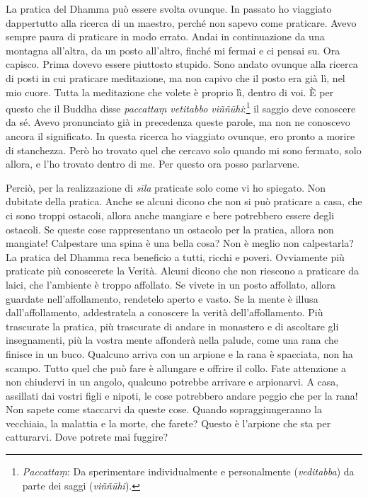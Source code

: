 La pratica del Dhamma può essere svolta ovunque. In passato ho viaggiato
dappertutto alla ricerca di un maestro, perché non sapevo come
praticare. Avevo sempre paura di praticare in modo errato. Andai in
continuazione da una montagna all'altra, da un posto all'altro, finché
mi fermai e ci pensai su. Ora capisco. Prima dovevo essere piuttosto
stupido. Sono andato ovunque alla ricerca di posti in cui praticare
meditazione, ma non capivo che il posto era già lì, nel mio cuore. Tutta
la meditazione che volete è proprio lì, dentro di voi. È per questo che
il Buddha disse \emph{paccattaṃ vetitabbo viññūhi}:\footnote{\emph{Paccattaṃ}:
  Da sperimentare individualmente e personalmente (\emph{veditabba}) da
  parte dei saggi (\emph{viññūhi}).} il saggio deve conoscere da sé.
Avevo pronunciato già in precedenza queste parole, ma non ne conoscevo
ancora il significato. In questa ricerca ho viaggiato ovunque, ero
pronto a morire di stanchezza. Però ho trovato quel che cercavo solo
quando mi sono fermato, solo allora, e l'ho trovato dentro di me. Per
questo ora posso parlarvene.

Perciò, per la realizzazione di \emph{sīla} praticate solo come vi ho
spiegato. Non dubitate della pratica. Anche se alcuni dicono che non si
può praticare a casa, che ci sono troppi ostacoli, allora anche mangiare
e bere potrebbero essere degli ostacoli. Se queste cose rappresentano un
ostacolo per la pratica, allora non mangiate! Calpestare una spina è una
bella cosa? Non è meglio non calpestarla? La pratica del Dhamma reca
beneficio a tutti, ricchi e poveri. Ovviamente più praticate più
conoscerete la Verità. Alcuni dicono che non riescono a praticare da
laici, che l'ambiente è troppo affollato. Se vivete in un posto
affollato, allora guardate nell'affollamento, rendetelo aperto e vasto.
Se la mente è illusa dall'affollamento, addestratela a conoscere la
verità dell'affollamento. Più trascurate la pratica, più trascurate di
andare in monastero e di ascoltare gli insegnamenti, più la vostra mente
affonderà nella palude, come una rana che finisce in un buco. Qualcuno
arriva con un arpione e la rana è spacciata, non ha scampo. Tutto quel
che può fare è allungare e offrire il collo. Fate attenzione a non
chiudervi in un angolo, qualcuno potrebbe arrivare e arpionarvi. A casa,
assillati dai vostri figli e nipoti, le cose potrebbero andare peggio
che per la rana! Non sapete come staccarvi da queste cose. Quando
sopraggiungeranno la vecchiaia, la malattia e la morte, che farete?
Questo è l'arpione che sta per catturarvi. Dove potrete mai fuggire?

